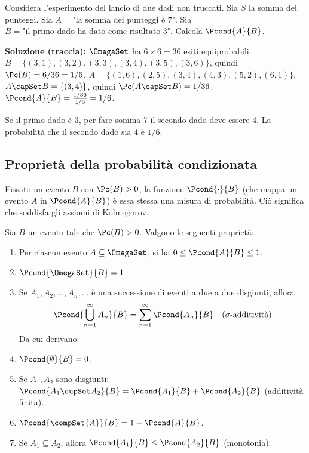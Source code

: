 \begin{exercise}
Considera l'esperimento del lancio di due dadi non truccati.
Sia $S$ la somma dei punteggi.
Sia $A = \text{"la somma dei punteggi è 7"}$.
Sia $B = \text{"il primo dado ha dato come risultato 3"}$.
Calcola $\Pcond{A}{B}$.
\end{exercise}
\textbf{Soluzione (traccia):}
$\OmegaSet$ ha $6 \times 6 = 36$ esiti equiprobabili.
$B = \{(3,1), (3,2), (3,3), (3,4), (3,5), (3,6)\}$, quindi $\Pc(B) = 6/36 = 1/6$.
$A = \{(1,6), (2,5), (3,4), (4,3), (5,2), (6,1)\}$.
$A \capSet B = \{(3,4)\}$, quindi $\Pc(A \capSet B) = 1/36$.
$\Pcond{A}{B} = \frac{1/36}{1/6} = 1/6$.
\begin{remark}
Se il primo dado è 3, per fare somma 7 il secondo dado deve essere 4. La probabilità che il secondo dado sia 4 è $1/6$.
\end{remark}

\subsection{Proprietà della probabilità condizionata}
Fissato un evento $B$ con $\Pc(B)>0$, la funzione $\Pcond{\cdot}{B}$ (che mappa un evento $A$ in $\Pcond{A}{B}$) è essa stessa una misura di probabilità. Ciò significa che soddisfa gli assiomi di Kolmogorov.

\begin{theorem}
Sia $B$ un evento tale che $\Pc(B)>0$. Valgono le seguenti proprietà:
\begin{enumerate}[label=\Roman*)]
    \item Per ciascun evento $A \subseteq \OmegaSet$, si ha $0 \le \Pcond{A}{B} \le 1$.
    \item $\Pcond{\OmegaSet}{B} = 1$.
    \item Se $A_1, A_2, \dots, A_n, \dots$ è una successione di eventi a due a due disgiunti, allora
    \[ \Pcond{\bigcup_{n=1}^\infty A_n}{B} = \sum_{n=1}^\infty \Pcond{A_n}{B} \quad (\sigma\text{-additività}) \]
    Da cui derivano:
    \item $\Pcond{\emptyset}{B} = 0$.
    \item Se $A_1, A_2$ sono disgiunti: $\Pcond{A_1 \cupSet A_2}{B} = \Pcond{A_1}{B} + \Pcond{A_2}{B}$ (additività finita).
    \item $\Pcond{\compSet{A}}{B} = 1 - \Pcond{A}{B}$.
    \item Se $A_1 \subseteq A_2$, allora $\Pcond{A_1}{B} \le \Pcond{A_2}{B}$ (monotonia).
\end{enumerate}
\end{theorem}

